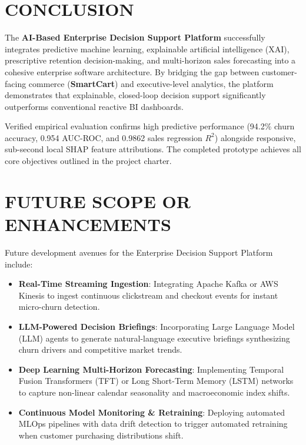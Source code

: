 \documentclass[12pt,a4paper]{article}
\begin{document}
\newpage

\section{CONCLUSION}\label{chap:10}

The \textbf{AI-Based Enterprise Decision Support Platform} successfully integrates predictive machine learning, explainable artificial intelligence (XAI), prescriptive retention decision-making, and multi-horizon sales forecasting into a cohesive enterprise software architecture. By bridging the gap between customer-facing commerce (\textbf{SmartCart}) and executive-level analytics, the platform demonstrates that explainable, closed-loop decision support significantly outperforms conventional reactive BI dashboards.

Verified empirical evaluation confirms high predictive performance (94.2\% churn accuracy, 0.954 AUC-ROC, and 0.9862 sales regression $R^2$) alongside responsive, sub-second local SHAP feature attributions. The completed prototype achieves all core objectives outlined in the project charter.

\newpage

\section{FUTURE SCOPE OR ENHANCEMENTS}\label{chap:11}

Future development avenues for the Enterprise Decision Support Platform include:
\begin{itemize}[leftmargin=20pt]
    \item \textbf{Real-Time Streaming Ingestion}: Integrating Apache Kafka or AWS Kinesis to ingest continuous clickstream and checkout events for instant micro-churn detection.
    \item \textbf{LLM-Powered Decision Briefings}: Incorporating Large Language Model (LLM) agents to generate natural-language executive briefings synthesizing churn drivers and competitive market trends.
    \item \textbf{Deep Learning Multi-Horizon Forecasting}: Implementing Temporal Fusion Transformers (TFT) or Long Short-Term Memory (LSTM) networks to capture non-linear calendar seasonality and macroeconomic index shifts.
    \item \textbf{Continuous Model Monitoring \& Retraining}: Deploying automated MLOps pipelines with data drift detection to trigger automated retraining when customer purchasing distributions shift.
\end{itemize}
\end{document}
